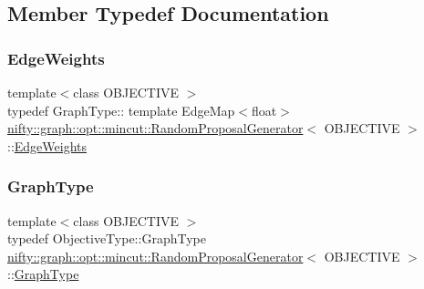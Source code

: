 \subsection{Member Typedef Documentation}
\mbox{\label{classnifty_1_1graph_1_1opt_1_1mincut_1_1RandomProposalGenerator_ad8eeb72ea540fb03089f90f643d59a96}} 
\subsubsection{\texorpdfstring{Edge\+Weights}{EdgeWeights}}
{\footnotesize\ttfamily template$<$class O\+B\+J\+E\+C\+T\+I\+VE $>$ \\
typedef Graph\+Type\+:: template Edge\+Map$<$float$>$ \hyperlink{classnifty_1_1graph_1_1opt_1_1mincut_1_1RandomProposalGenerator}{nifty\+::graph\+::opt\+::mincut\+::\+Random\+Proposal\+Generator}$<$ O\+B\+J\+E\+C\+T\+I\+VE $>$\+::\hyperlink{classnifty_1_1graph_1_1opt_1_1mincut_1_1RandomProposalGenerator_ad8eeb72ea540fb03089f90f643d59a96}{Edge\+Weights}}

\mbox{\label{classnifty_1_1graph_1_1opt_1_1mincut_1_1RandomProposalGenerator_a13dd854d470ea464aa2aa14b08358401}} 
\subsubsection{\texorpdfstring{Graph\+Type}{GraphType}}
{\footnotesize\ttfamily template$<$class O\+B\+J\+E\+C\+T\+I\+VE $>$ \\
typedef Objective\+Type\+::\+Graph\+Type \hyperlink{classnifty_1_1graph_1_1opt_1_1mincut_1_1RandomProposalGenerator}{nifty\+::graph\+::opt\+::mincut\+::\+Random\+Proposal\+Generator}$<$ O\+B\+J\+E\+C\+T\+I\+VE $>$\+::\hyperlink{classnifty_1_1graph_1_1opt_1_1mincut_1_1ProposalGeneratorBase_af97d0dbcc40754191cc6fa0c2baa6018}{Graph\+Type}}

